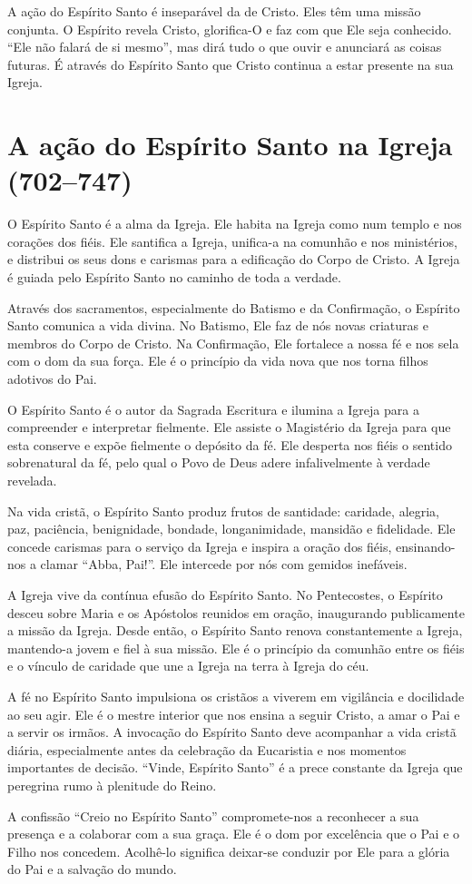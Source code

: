 A ação do Espírito Santo é inseparável da de Cristo. Eles têm uma missão conjunta. O Espírito revela Cristo, glorifica-O e faz com que Ele seja conhecido. ``Ele não falará de si mesmo'', mas dirá tudo o que ouvir e anunciará as coisas futuras. É através do Espírito Santo que Cristo continua a estar presente na sua Igreja.

\section{A ação do Espírito Santo na Igreja (702--747)}

O Espírito Santo é a alma da Igreja. Ele habita na Igreja como num templo e nos corações dos fiéis. Ele santifica a Igreja, unifica-a na comunhão e nos ministérios, e distribui os seus dons e carismas para a edificação do Corpo de Cristo. A Igreja é guiada pelo Espírito Santo no caminho de toda a verdade.

Através dos sacramentos, especialmente do Batismo e da Confirmação, o Espírito Santo comunica a vida divina. No Batismo, Ele faz de nós novas criaturas e membros do Corpo de Cristo. Na Confirmação, Ele fortalece a nossa fé e nos sela com o dom da sua força. Ele é o princípio da vida nova que nos torna filhos adotivos do Pai.

O Espírito Santo é o autor da Sagrada Escritura e ilumina a Igreja para a compreender e interpretar fielmente. Ele assiste o Magistério da Igreja para que esta conserve e expõe fielmente o depósito da fé. Ele desperta nos fiéis o sentido sobrenatural da fé, pelo qual o Povo de Deus adere infalivelmente à verdade revelada.

Na vida cristã, o Espírito Santo produz frutos de santidade: caridade, alegria, paz, paciência, benignidade, bondade, longanimidade, mansidão e fidelidade. Ele concede carismas para o serviço da Igreja e inspira a oração dos fiéis, ensinando-nos a clamar ``Abba, Pai!''. Ele intercede por nós com gemidos inefáveis.

A Igreja vive da contínua efusão do Espírito Santo. No Pentecostes, o Espírito desceu sobre Maria e os Apóstolos reunidos em oração, inaugurando publicamente a missão da Igreja. Desde então, o Espírito Santo renova constantemente a Igreja, mantendo-a jovem e fiel à sua missão. Ele é o princípio da comunhão entre os fiéis e o vínculo de caridade que une a Igreja na terra à Igreja do céu.

A fé no Espírito Santo impulsiona os cristãos a viverem em vigilância e docilidade ao seu agir. Ele é o mestre interior que nos ensina a seguir Cristo, a amar o Pai e a servir os irmãos. A invocação do Espírito Santo deve acompanhar a vida cristã diária, especialmente antes da celebração da Eucaristia e nos momentos importantes de decisão. ``Vinde, Espírito Santo'' é a prece constante da Igreja que peregrina rumo à plenitude do Reino.

A confissão ``Creio no Espírito Santo'' compromete-nos a reconhecer a sua presença e a colaborar com a sua graça. Ele é o dom por excelência que o Pai e o Filho nos concedem. Acolhê-lo significa deixar-se conduzir por Ele para a glória do Pai e a salvação do mundo.
